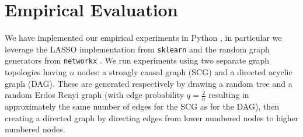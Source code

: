 \documentclass[12pt]{article}
\begin{document}
\begin{algorithm}
\end{algorithm}

\section{Empirical Evaluation}
\label{sec:empirical_evaluation}
We have implemented our empirical experiments in Python \cite{scipy},
in particular we leverage the LASSO implementation from
\texttt{sklearn} \cite{sklearn} and the random graph generators from
\texttt{networkx} \cite{networkx}.  We run experiments using two
separate graph topologies having $n$ nodes: a strongly causal graph
(SCG) and a directed acyclic graph (DAG).  These are generated
respectively by drawing a random tree and a random Erdos Renyi graph
(with edge probability $q = \frac{2}{n}$ resulting in approximately
the same number of edges for the SCG as for the DAG), then creating a
directed graph by directing edges from lower numbered nodes to higher
numbered nodes.
\end{document}
